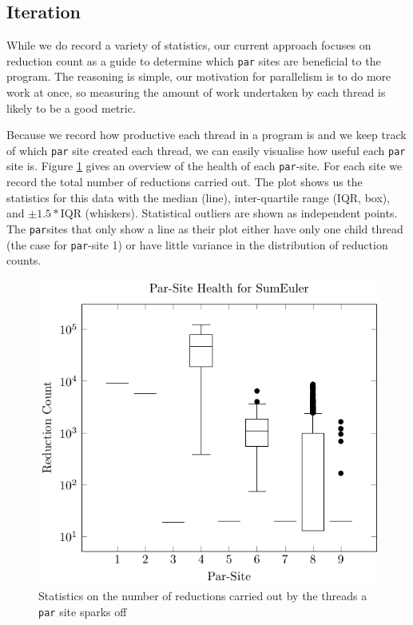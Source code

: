 \subsection{Iteration}

While we do record a variety of statistics, our current approach focuses on
reduction count as a guide to determine which \verb-par- sites are beneficial
to the program.  The reasoning is simple, our motivation for parallelism is to
do more work at once, so measuring the amount of work undertaken by each thread
is likely to be a good metric.

Because we record how productive each thread in a program is and we keep track
of which \verb-par- site created each thread, we can easily visualise how useful
each \verb-par- site is. Figure \ref{fig:sumHist} gives an overview of the health
of each \verb-par--site. For each site we record the total number of reductions
carried out. The plot shows us the statistics for this data with the median
(line), inter-quartile range (IQR, box), and $\pm1.5 * $IQR (whiskers).
Statistical outliers are shown as independent points. The \verb-par-sites that
only show a line as their plot either have only one child thread (the case for
\verb-par--site 1) or have little variance in the distribution of reduction
counts.

\begin{figure}
  \includegraphics[width=\linewidth]{Informed/Figures/threadhealth.pdf}
\caption{Statistics on the number of reductions carried out by the threads a
\texttt{par} site sparks off}
\label{fig:sumHist}
\end{figure}

